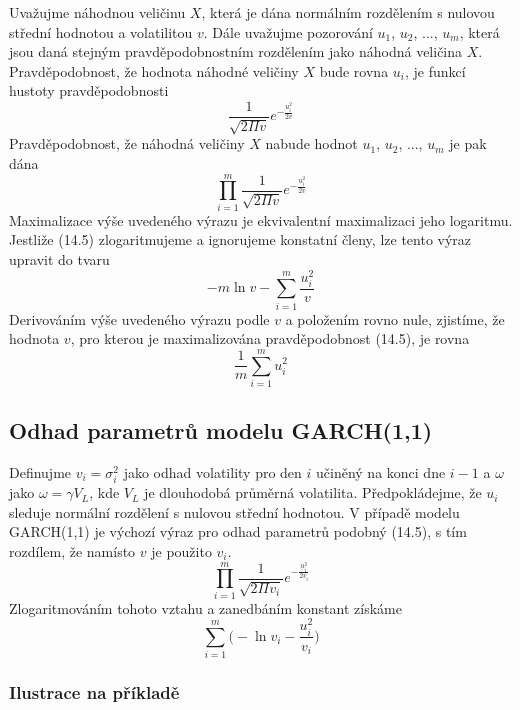 \documentclass[a4paper]{book}
\begin{document}
Uvažujme náhodnou veličinu $X$, která je dána normálním rozdělením s nulovou střední hodnotou a volatilitou $v$. Dále uvažujme pozorování $u_1$, $u_2$, ..., $u_m$, která jsou daná stejným pravděpodobnostním rozdělením jako náhodná veličina $X$. Pravděpodobnost, že hodnota náhodné veličiny $X$ bude rovna $u_i$, je funkcí hustoty pravděpodobnosti
\begin{equation*}
\frac{1}{\sqrt{2 \Pi v}}e^{-\frac{u_i^2}{2v}}
\end{equation*}
Pravděpodobnost, že náhodná veličiny $X$ nabude hodnot $u_1$, $u_2$, ..., $u_m$ je pak dána
\begin{equation}
\prod_{i=1}^m \frac{1}{\sqrt{2 \Pi v}}e^{-\frac{u_i^2}{2v}}
\end{equation}
Maximalizace výše uvedeného výrazu je ekvivalentní maximalizaci jeho logaritmu. Jestliže (14.5) zlogaritmujeme a ignorujeme konstatní členy, lze tento výraz upravit do tvaru
\begin{equation*}
-m \ln v - \sum_{i=1}^m \frac{u_i^2}{v}
\end{equation*}
Derivováním výše uvedeného výrazu podle $v$ a položením rovno nule, zjistíme, že hodnota $v$, pro kterou je maximalizována pravděpodobnost (14.5), je rovna
\begin{equation*}
\frac{1}{m} \sum_{i=1}^m u_i^2
\end{equation*}

\subsection{Odhad parametrů modelu GARCH(1,1)}
Definujme $v_i = \sigma_i^2$ jako odhad volatility pro den $i$ učiněný na konci dne $i-1$ a $\omega$ jako $\omega = \gamma V_L$, kde $V_L$ je  dlouhodobá průměrná volatilita. Předpokládejme, že $u_i$ sleduje normální rozdělení s nulovou střední hodnotou. V případě modelu GARCH(1,1) je výchozí výraz pro odhad parametrů podobný (14.5), s tím rozdílem, že namísto $v$ je použito $v_i$.
\begin{equation*}
\prod_{i=1}^m \frac{1}{\sqrt{2 \Pi v_i}}e^{-\frac{u_i^2}{2v_i}}
\end{equation*}
Zlogaritmováním tohoto vztahu a zanedbáním konstant získáme
\begin{equation}
\sum_{i=1}^m \Big( -\ln v_i - \frac{u_i^2}{v_i} \Big)
\end{equation}

\subsubsection{Ilustrace na příkladě}
\end{document}
